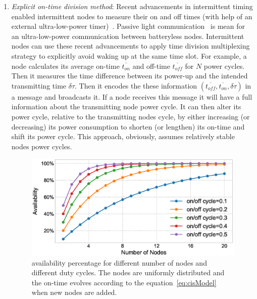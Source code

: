 \begin{enumerate}%
%
		\item \textit{Explicit on-time division method}: Recent advancements in intermittent timing enabled intermittent nodes to measure their on and off times (with help of an external ultra-low-power timer)~\cite{mayfly2017hester}. Passive light communication~\cite{marco} is mean for an ultra-low-power communication between batteryless nodes. Intermittent nodes can use these recent advancements to apply time division multiplexing strategy to explicitly avoid waking up at the same time slot. For example, a node calculates its average on-time $\overline{t_{on}}$ and off-time $\overline{t_{off}}$ for $N$ power cycles. Then it measures the time difference between its power-up and the intended transmitting time $\delta\tau$. Then it encodes the these information $({\overline{t_{off}}, \overline{t_{on}}, \delta\tau})$ in a message and broadcasts it. If a node receives this message it will have a full information about the transmitting node power cycle. It can then alter its power cycle, relative to the transmitting nodes cycle, by either increasing (or decreasing) its power consumption to shorten (or lengthen) its on-time and shift its power cycle. This approach, obviously, assumes relatively stable nodes power cycles. 
%
\begin{figure}
		\centering
		\includegraphics[width=\columnwidth]{figures/cisModel}
		\caption{\fullsys availability percentage for different number of nodes and different duty cycles. The nodes are uniformly distributed and the \sys on-time evolves according to the equation~\ref{eq:cisModel} when new nodes are added.}
		\label{fig:cisModel}
\end{figure} 
%

\end{enumerate}
